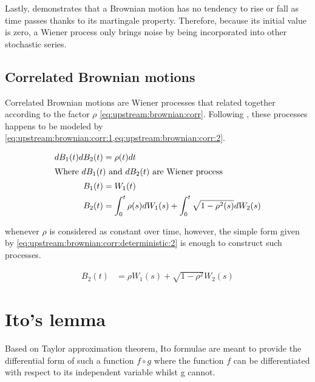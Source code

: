 \documentclass[12pt]{report}
\begin{document}
Lastly, \citet{shreve} demonstrates that a Brownian motion has no tendency to rise or fall as time passes thanks to its martingale property. Therefore, because its initial value is zero, a Wiener process only brings noise by being incorporated into other stochastic series.

\subsection{Correlated Brownian motions}
\label{sub:upstream:brownian:correlated}

Correlated Brownian motions are Wiener processes that related together according to the factor $\rho$ \ref{eq:upstream:brownian:corr}.
Following \citet{shreve}, these processes happens to be modeled by \cref{eq:upstream:brownian:corr:1,eq:upstream:brownian:corr:2}.

\begin{align}
  dB_1(t) dB_2(t) &= \rho(t) dt \label{eq:upstream:brownian:corr} \\
  \intertext{Where $dB_1(t)$ and $dB_2(t)$ are Wiener process }
  B_1(t) &= W_1(t) \label{eq:upstream:brownian:corr:1} \\
  B_2(t) &= \int_0^t \rho(s) dW_1(s) + \int_0^t \sqrt{1 - \rho^2(s)} dW_2(s) \label{eq:upstream:brownian:corr:2}
\end{align}

whenever $\rho$ is considered as constant over time, however, the simple form given by  \cref{eq:upstream:brownian:corr:deterministic:2} is enough to construct such processes.

\begin{align}
B_2(t) &= \rho W_1(s) + \sqrt{1 - \rho^2} W_2(s) \label{eq:upstream:brownian:corr:deterministic:2}
\end{align}


\section{Ito's lemma}
\label{sec:upstream:ito}

Based on Taylor approximation theorem, Ito formulae are meant to provide the differential form of such a function $f \circ g$ where the function $f$ can be differentiated with respect to its independent variable whilst g cannot.
\end{document}

